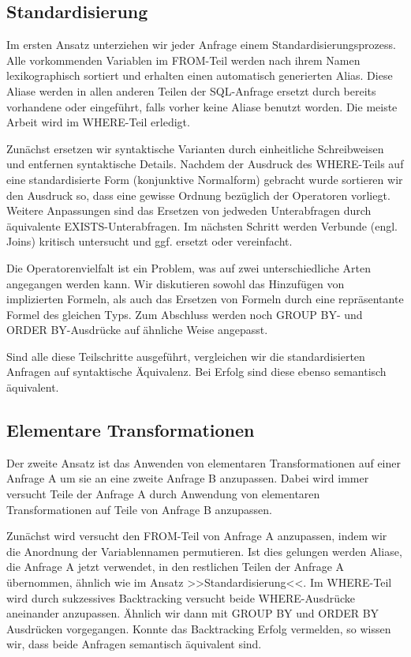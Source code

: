 \subsection{Standardisierung}

Im ersten Ansatz unterziehen wir jeder Anfrage einem Standardisierungsprozess. Alle vorkommenden Variablen im FROM-Teil werden nach ihrem Namen lexikographisch sortiert und erhalten einen automatisch generierten Alias. Diese Aliase werden in allen anderen Teilen der SQL-Anfrage ersetzt durch bereits vorhandene oder eingeführt, falls vorher keine Aliase benutzt worden. Die meiste Arbeit wird im WHERE-Teil erledigt. 

Zunächst ersetzen wir syntaktische Varianten durch einheitliche Schreibweisen und entfernen syntaktische Details. Nachdem der Ausdruck des WHERE-Teils auf eine standardisierte Form (konjunktive Normalform) gebracht wurde sortieren wir den Ausdruck so, dass eine gewisse Ordnung bezüglich der Operatoren vorliegt. Weitere Anpassungen sind das Ersetzen von jedweden Unterabfragen durch äquivalente EXISTS-Unterabfragen. Im nächsten Schritt werden Verbunde (engl. Joins) kritisch untersucht und ggf. ersetzt oder vereinfacht. 

Die Operatorenvielfalt ist ein Problem, was auf zwei unterschiedliche Arten angegangen werden kann. Wir diskutieren sowohl das Hinzufügen von implizierten Formeln, als auch das Ersetzen von Formeln durch eine repräsentante Formel des gleichen Typs. Zum Abschluss werden noch GROUP BY- und ORDER BY-Ausdrücke auf ähnliche Weise angepasst.

Sind alle diese Teilschritte ausgeführt, vergleichen wir die standardisierten Anfragen auf syntaktische Äquivalenz. Bei Erfolg sind diese ebenso semantisch äquivalent.

\subsection{Elementare Transformationen}

Der zweite Ansatz ist das Anwenden von elementaren Transformationen auf einer Anfrage A um sie an eine zweite Anfrage B anzupassen. Dabei wird immer versucht Teile der Anfrage A durch Anwendung von elementaren Transformationen auf Teile von Anfrage B anzupassen. 

Zunächst wird versucht den FROM-Teil von Anfrage A anzupassen, indem wir die Anordnung der Variablennamen permutieren. Ist dies gelungen werden Aliase, die Anfrage A jetzt verwendet, in den restlichen Teilen der Anfrage A übernommen, ähnlich wie im Ansatz >>Standardisierung<<. Im WHERE-Teil wird durch sukzessives Backtracking versucht beide WHERE-Ausdrücke aneinander anzupassen. Ähnlich wir dann mit GROUP BY und ORDER BY Ausdrücken vorgegangen. Konnte das Backtracking Erfolg vermelden, so wissen wir, dass beide Anfragen semantisch äquivalent sind. 

